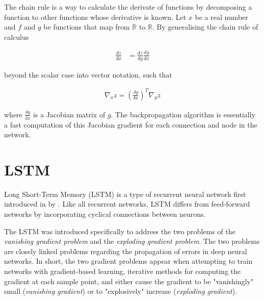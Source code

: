 \newcommand{\R}{\mathbb{R}}

The chain rule is a way to calculate the derivate of functions by decomposing a function to other functions whose derivative is known. Let $x$ be a real number and $f$ and $g$ be functions that map from $\R$ to $\R$. By generalising the chain rule of calculus

\begin{align}
    \frac{dz}{dx} &= \frac{dz}{dy}\frac{dy}{dx}
\end{align}

beyond the scalar case into vector notation, such that 

\begin{align}
    \nabla_{x}z = (\frac{\delta y}{\delta x})^T \nabla_{y}z
\end{align}

where $\frac{\delta y}{\delta x}$ is a Jacobian matrix of $g$. The backpropagation algorithm is essentially a fast computation of this Jacobian gradient for each connection and node in the network.

\section{LSTM}
Long Short-Term Memory (LSTM) is a type of recurrent neural network first introduced in \citeyear{lstm} by \citeauthor{lstm}. Like all recurrent networks, LSTM differs from feed-forward networks by incorporating cyclical connections between neurons.

The LSTM was introduced specifically to address the two problems of the \emph{vanishing gradient problem} and the \emph{exploding gradient problem}. The two problems are closely linked problems regarding the propagation of errors in deep neural networks. In short, the two gradient problems appear when attempting to train networks with gradient-based learning, iterative methods for computing the gradient at each sample point, and either cause the gradient to be "vanishingly" small (\emph{vanishing gradient}) or to "explosively" increase (\emph{exploding gradient}).
